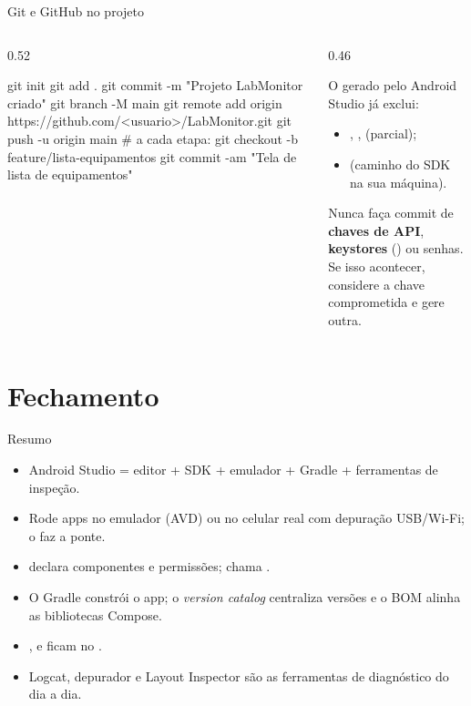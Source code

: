 \documentclass[aspectratio=169,10pt]{beamer}
\begin{document}
\begin{frame}[fragile]{Git e GitHub no projeto}
  \begin{columns}[T]
    \begin{column}{0.52\textwidth}
\begin{terminal}[title=Fluxo básico]
git init
git add .
git commit -m "Projeto LabMonitor criado"
git branch -M main
git remote add origin https://github.com/<usuario>/LabMonitor.git
git push -u origin main
# a cada etapa:
git checkout -b feature/lista-equipamentos
git commit -am "Tela de lista de equipamentos"
\end{terminal}
    \end{column}
    \begin{column}{0.46\textwidth}
      \begin{conceito}
        O  gerado pelo Android Studio já exclui:
        \begin{itemize}
          \item {}, ,  (parcial);
          \item {} (caminho do SDK na sua máquina).
        \end{itemize}
      \end{conceito}
      \begin{atencao}
        Nunca faça commit de \textbf{chaves de API}, \textbf{keystores} () ou senhas. Se isso acontecer, considere a chave comprometida e gere outra.
      \end{atencao}
    \end{column}
  \end{columns}
\end{frame}

\section{Fechamento}

\begin{frame}{Resumo}
  \begin{resumo}
    \begin{itemize}
      \item Android Studio = editor + SDK + emulador + Gradle + ferramentas de inspeção.
      \item Rode apps no emulador (AVD) ou no celular real com depuração USB/Wi-Fi; o  faz a ponte.
      \item {} declara componentes e permissões;  chama .
      \item O Gradle constrói o app; o \emph{version catalog} centraliza versões e o BOM alinha as bibliotecas Compose.
      \item {},  e  ficam no .
      \item Logcat, depurador e Layout Inspector são as ferramentas de diagnóstico do dia a dia.
    \end{itemize}
  \end{resumo}
\end{frame}
\end{document}
